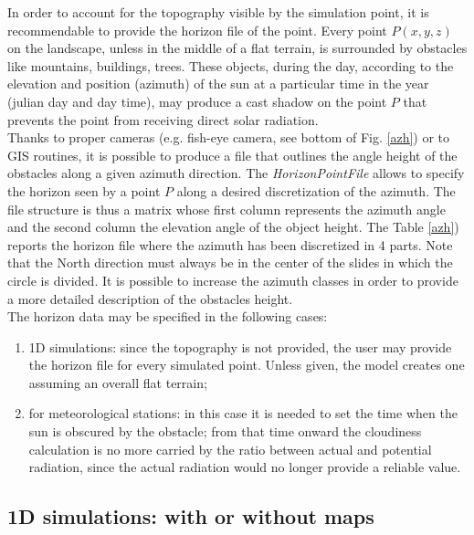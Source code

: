 In order to account for the topography visible by the simulation point, it is recommendable to provide the horizon file of the point.
Every point $P(x,y,z)$ on the landscape, unless in the middle of a flat terrain, is surrounded by obstacles like mountains, buildings, trees. These objects, during the day, according to the elevation and position (azimuth) of the sun at a particular time in the year (julian day and day time), may produce a cast shadow on the point $P$ that prevents the point from receiving direct solar radiation. \\
Thanks to proper cameras (e.g. fish-eye camera, see bottom of Fig. \ref{azh}) or to GIS routines, it is possible to produce a file that outlines the angle height of the obstacles along a given azimuth direction.
The {\it HorizonPointFile}  allows to specify the horizon seen by a point $P$ along a desired discretization of the azimuth. The file structure is thus a matrix whose first column represents the azimuth angle and the second column the elevation angle of the object height. The Table \ref{azh}) reports the horizon file where the azimuth has been discretized in 4 parts. Note that the North direction must always be in the center of the slides in which the circle is divided. It is possible to increase the azimuth classes in order to provide a more detailed description of the obstacles height.\\
The horizon data may be specified in the following cases:
\begin{enumerate}
 \item 1D simulations: since the topography is not provided, the user may provide the horizon file for every simulated point. 
Unless given, the model creates one assuming an overall flat terrain;
 \item for meteorological stations: in this case it is needed to set the time when the sun is obscured by the obstacle; from that time onward the cloudiness calculation is no more carried by the ratio between actual and potential radiation, since the actual radiation would no longer provide a reliable value.
\end{enumerate}

\subsection{1D simulations: with or without maps}\label{}

